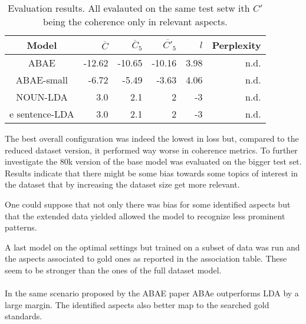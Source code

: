 \begin{center}
    \begin{table}
        \begin{tabular}{c r r r r r}
            \hline
            Model        & $\overline{C}$ & $\overline{C}_5$ & $\overline{C'}_5$ & $l$  & Perplexity\\ [0.5ex]
            \hline
            ABAE         & -12.62         & -10.65           & -10.16            & 3.98 & n.d.       \\
            \hline
            ABAE-small   & -6.72          & -5.49            & -3.63             & 4.06 & n.d.       \\
            \hline %
            NOUN-LDA     & 3.0            & 2.1              & 2                 & -3   & n.d.       \\
            \hline e %
            sentence-LDA & 3.0            & 2.1              & 2                 & -3   & n.d.       \\
            \hline
        \end{tabular}
        \caption{Evaluation results. All evalauted on the same test setw ith $C'$ being the coherence only in relevant aspects.
        }
        \label{performance-review}

    \end{table}

\end{center}


The best overall configuration was indeed the lowest in loss but, compared to the reduced
dataset version, it performed way worse in coherence metrics.
To further investigate the 80k version of the base model was evaluated on the bigger test set.
Results indicate that there might be some bias towards some topics of interest in the dataset
that by increasing the dataset size get more relevant.

One could suppose that not only there was bias for some identified aspects but that the extended
data yielded allowed the model to recognize less prominent patterns.

A last model on the optimal settings but trained on a subset of data was run and the aspects
associated to gold ones as reported in the association table.
These seem to be stronger than the ones of the full dataset model.

\paragraph{}
In the same scenario proposed by the ABAE paper ABAe outperforms LDA by a large margin.
The identified aspects also better map to the searched gold standards.

